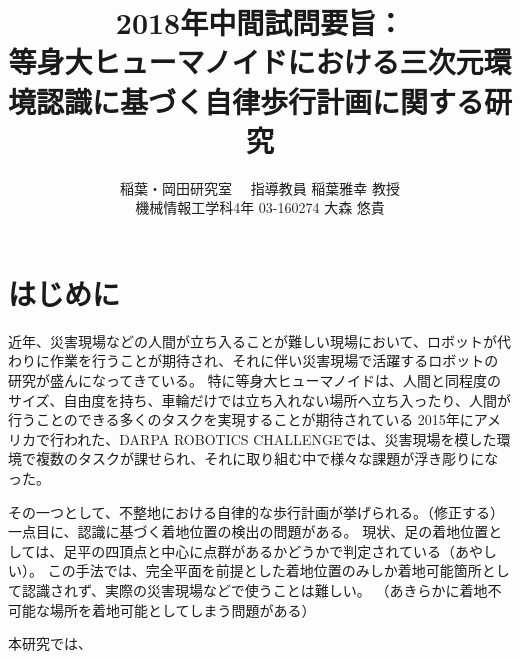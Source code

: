 \documentclass[twocolumn]{preport}
\title{2018年中間試問要旨：\\
等身大ヒューマノイドにおける三次元環境認識に基づく自律歩行計画に関する研究}
\author{稲葉・岡田研究室 　指導教員 稲葉雅幸 教授\\
  機械情報工学科4年 03-160274 大森 悠貴 }
\begin{document}
\pagestyle{empty}
\maketitle
\thispagestyle{empty}
\sloppy

\section{はじめに}
近年、災害現場などの人間が立ち入ることが難しい現場において、ロボットが代わりに作業を行うことが期待され、それに伴い災害現場で活躍するロボットの研究が盛んになってきている。
特に等身大ヒューマノイドは、人間と同程度のサイズ、自由度を持ち、車輪だけでは立ち入れない場所へ立ち入ったり、人間が行うことのできる多くのタスクを実現することが期待されている
2015年にアメリカで行われた、DARPA ROBOTICS CHALLENGEでは、災害現場を模した環境で複数のタスクが課せられ、それに取り組む中で様々な課題が浮き彫りになった。

その一つとして、不整地における自律的な歩行計画が挙げられる。（修正する）
一点目に、認識に基づく着地位置の検出の問題がある。
現状、足の着地位置としては、足平の四頂点と中心に点群があるかどうかで判定されている（あやしい）。
この手法では、完全平面を前提とした着地位置のみしか着地可能箇所として認識されず、実際の災害現場などで使うことは難しい。
（あきらかに着地不可能な場所を着地可能としてしまう問題がある）

本研究では、





\end{document}
